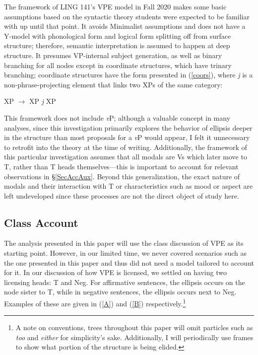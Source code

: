 \documentclass[11pt, oneside]{article}
\begin{document}
The framework of LING 141's VPE model in Fall 2020 makes some basic assumptions based on the syntactic theory students were expected to be familiar with up until that point. It avoids Minimalist assumptions and does not have a Y-model with phonological form and logical form splitting off from surface structure; therefore, semantic interpretation is assumed to happen at deep structure. It presumes VP-internal subject generation, as well as binary branching for all nodes except in coordinate structures, which have trinary branching; coordinate structures have the form presented in (\ref{coors}), where \textit{j} is a non-phrase-projecting element that links two XPs of the same category:

\begin{exe}
\ex\label{coors} XP $\rightarrow$ XP \textit{j} XP
\end{exe}

This framework does not include \textit{v}P; although a valuable concept in many analyses, since this investigation primarily explores the behavior of ellipsis deeper in the structure than most proposals for a \textit{v}P would appear, I felt it unnecessary to retrofit into the theory at the time of writing. Additionally, the framework of this particular investigation assumes that all modals are Vs which later move to T, rather than T heads themselves---this is important to account for relevant observations in \S\ref{SecAccAux}. Beyond this generalization, the exact nature of modals and their interaction with T or characteristics such as mood or aspect are left undeveloped since these processes are not the direct object of study here.

\subsection{Class Account}\label{SecClass}

The analysis presented in this paper will use the class discussion of VPE as its starting point. However, in our limited time, we never covered scenarios such as the one presented in this paper and thus did not need a model tailored to account for it. In our discussion of how VPE is licensed, we settled on having two licensing heads: T and Neg. For affirmative sentences, the ellipsis occurs on the node sister to T, while in negative sentences, the ellipsis occurs next to Neg. Examples of these are given in (\ref{A}) and (\ref{B}) respectively.\footnote{A note on conventions, trees throughout this paper will omit particles such as \textit{too} and \textit{either} for simplicity's sake. Additionally, I will periodically use frames to show what portion of the structure is being elided.} 
\end{document}
